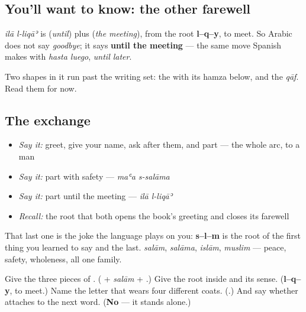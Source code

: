 \subsection*{You'll want to know: the other farewell}
\textbf{ } \emph{ilā l-liqāʾ} is \textbf{} (\emph{until}) plus \textbf{} (\emph{the meeting}), from the root \textbf{l–q–y}, to meet. So Arabic does not say \emph{goodbye}; it says \textbf{until the meeting} — the same move Spanish makes with \emph{hasta luego}, \emph{until later}.

Two shapes in it run past the writing set: the \textbf{} with its hamza below, and the \textbf{} \emph{qāf}. Read them for now.

\subsection*{The exchange}
\begin{itemize}
\raggedright
  \item \emph{Say it:} greet, give your name, ask after them, and part — the whole arc, to a man
  \item \emph{Say it:} part with safety — \emph{maʿa s-salāma}
  \item \emph{Say it:} part until the meeting — \emph{ilā l-liqāʾ}
  \item \emph{Recall:} the root that both opens the book's greeting and closes its farewell
\end{itemize}

That last one is the joke the language plays on you: \textbf{s–l–m} is the root of the first thing you learned to say and the last. \emph{salām}, \emph{salāma}, \emph{islām}, \emph{muslim} — peace, safety, wholeness, all one family.

\begin{tcolorbox}[breakable,colback=teal!4,colframe=teal!35!black,title={Before you move on}]
Give the three pieces of \textbf{}. (\textbf{} + \emph{salām} + \textbf{}.) Give the root inside \textbf{} and its sense. (\textbf{l–q–y}, to meet.) Name the letter that wears four different coats. (\textbf{}.) And say whether \textbf{} attaches to the next word. (\textbf{No} — it stands alone.)
\end{tcolorbox}

